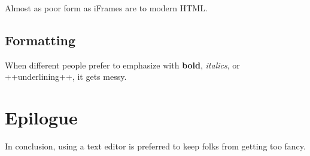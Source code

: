 \documentclass[
  openany]{book}
\begin{document}
Almost as poor form as iFrames are to modern HTML.

\section{Formatting}\label{formatting}

When different people prefer to emphasize with \textbf{bold}, \emph{italics}, or ++underlining++, it gets messy.

\chapter{Epilogue}\label{epilogue}

In conclusion, using a text editor is preferred to keep folks from getting too fancy.
\end{document}
